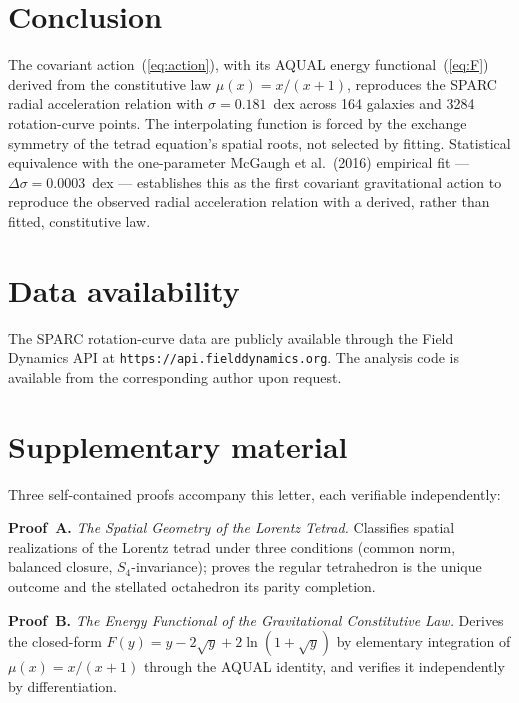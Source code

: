 \documentclass[twocolumn]{iopjournal}
\begin{document}

\section{Conclusion}

The covariant action~(\ref{eq:action}), with its AQUAL energy
functional~(\ref{eq:F}) derived from the constitutive law
$\mu(x) = x/(x+1)$, reproduces the SPARC radial acceleration
relation with $\sigma = 0.181$~dex across 164 galaxies and 3284
rotation-curve points.  The interpolating function is forced by
the exchange symmetry of the tetrad equation's spatial roots, not
selected by fitting.  Statistical equivalence with the
one-parameter McGaugh et al.\ (2016) empirical fit ---
$\Delta\sigma = 0.0003$~dex --- establishes this as the first
covariant gravitational action to reproduce the observed radial
acceleration relation with a derived, rather than fitted,
constitutive law.


\section*{Data availability}

The SPARC rotation-curve data are publicly available through
the Field Dynamics API at
\texttt{https://api.fielddynamics.org}.  The analysis code is
available from the corresponding author upon request.

\section*{Supplementary material}

Three self-contained proofs accompany this letter, each
verifiable independently:

\medskip
\noindent
\textbf{Proof~A.}
\textit{The Spatial Geometry of the Lorentz Tetrad.}\enspace
Classifies spatial realizations of the Lorentz tetrad under
three conditions (common norm, balanced closure,
$S_4$-invariance); proves the regular tetrahedron is the unique
outcome and the stellated octahedron its parity completion.

\medskip
\noindent
\textbf{Proof~B.}
\textit{The Energy Functional of the Gravitational Constitutive
Law.}\enspace
Derives the closed-form $F(y) = y - 2\sqrt{y} + 2\ln(1 +
\sqrt{y})$ by elementary integration of $\mu(x) = x/(x+1)$
through the AQUAL identity, and verifies it independently by
differentiation.
\end{document}
